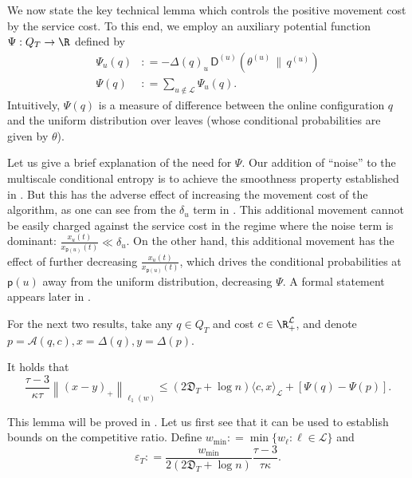 \documentclass{toc}
\newcommand{\calA}{\mathcal A}
\newcommand{\calL}{\mathcal L}
\newcommand{\dmid}{\,\|\,}
\newcommand{\eps}{\varepsilon}
\newcommand{\depth}{\mathfrak{D}}
\newcommand{\seteq}{\mathrel{\mathop:}=}
\newcommand{\sfp}{\mathsf{p}}
\newcommand{\sfD}{\mathsf D}
\begin{document}
We now state the key technical lemma
which controls the positive movement cost by
the service cost.  To this end, we employ an auxiliary potential function $\Psi : Q_T \to \R$ defined by
\begin{align*}
\Psi_u(q) &\seteq - \Delta(q)_u\,\sfD^{(u)}\!\left(\theta^{(u)} \dmid q^{(u)}\right) \\
\Psi(q) &\seteq \sum_{u \notin \calL} \Psi_u(q).
\end{align*}
Intuitively, $\Psi(q)$ is a measure of difference between the online configuration $q$ and the uniform distribution over leaves (whose conditional probabilities are given by $\theta$).

Let us give a brief explanation of the need for $\Psi$.
Our addition of ``noise'' to the multiscale conditional entropy
is to achieve the smoothness property established in .
But this has the adverse effect of increasing the movement cost
of the algorithm, as one can see from the $\delta_u$ term in .
This additional movement cannot be easily charged against the service cost in
the regime where the noise term is dominant:  $\frac{x_u(t)}{x_{\sfp(u)}(t)} \ll \delta_u$.
On the other hand, this additional movement has the effect of further decreasing $\frac{x_u(t)}{x_{\sfp(u)}(t)}$,
which drives the conditional probabilities at $\sfp(u)$ away from the uniform distribution,
decreasing $\Psi$.  A formal statement appears later in .

For the next two results, take any $q \in Q_T$ and cost $c \in \R_+^{\calL}$, and denote $p=\calA(q,c), x =\Delta(q),y=\Delta(p)$.

\begin{lemma}
	\label{lem:movement}
   It holds that
	\[
	\frac{\tau-3}{\kappa \tau} \left\|\left(x-y\right)_+\right\|_{\ell_1(w)} \leq (2 \depth_T + \log n) \langle c, x\rangle_{\calL} +
	\left[\Psi(q)-\Psi(p)\right].
	\]
\end{lemma}

This lemma will be proved in .
Let us first see that it can be used to establish bounds on the competitive ratio.
Define $w_{\min} \seteq \min \{ w_{\ell} : \ell \in \calL \}$
and
\[
\eps_T \seteq \frac{w_{\min}}{2 (2\depth_T+\log n)} \frac{\tau-3}{\tau\kappa}.
\]
\end{document}
